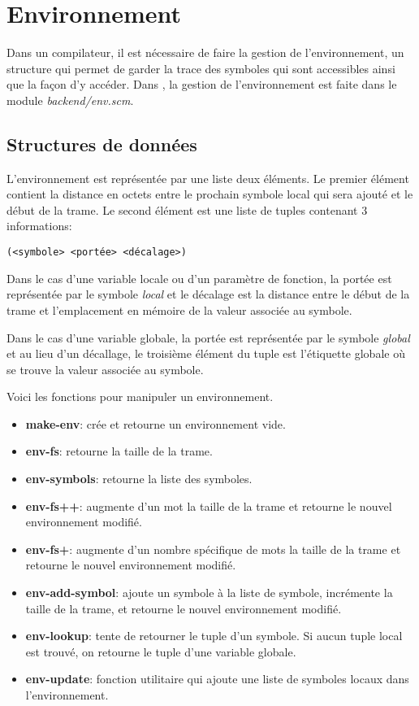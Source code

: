 \documentclass[10pt]{report}
\begin{document}
\chapter{Environnement}

Dans un compilateur, il est nécessaire de faire la gestion de
l'environnement, un structure qui permet de garder la trace des
symboles qui sont accessibles ainsi que la façon d'y accéder. Dans
\sins{}, la gestion de l'environnement est faite dans le module {\it
  backend/env.scm}.

\section{Structures de données}

L'environnement est représentée par une liste deux éléments. Le
premier élément contient la distance en octets entre le prochain
symbole local qui sera ajouté et le début de la trame. Le second
élément est une liste de tuples contenant 3 informations:


\begin{verbatim}
(<symbole> <portée> <décalage>)
\end{verbatim}

Dans le cas d'une variable locale ou d'un paramètre de fonction, la
portée est représentée par le symbole {\it local} et le décalage est la
distance entre le début de la trame et l'emplacement en mémoire de la
valeur associée au symbole.

Dans le cas d'une variable globale, la portée est représentée par le
symbole {\it global} et au lieu d'un décallage, le troisième élément
du tuple est l'étiquette globale où se trouve la valeur associée au
symbole.

Voici les fonctions pour manipuler un environnement.

\begin{itemize}
\item {\bf make-env}: crée et retourne un environnement vide.
\item {\bf env-fs}: retourne la taille de la trame.
\item {\bf env-symbols}: retourne la liste des symboles.
\item {\bf env-fs++}: augmente d'un mot la taille de la trame et
  retourne le nouvel environnement modifié.
\item {\bf env-fs+}: augmente d'un nombre spécifique de mots la taille
  de la trame et retourne le nouvel environnement modifié.
\item {\bf env-add-symbol}: ajoute un symbole à la liste de symbole,
  incrémente la taille de la trame, et retourne le nouvel
  environnement modifié.
\item {\bf env-lookup}: tente de retourner le tuple d'un symbole. Si
  aucun tuple local est trouvé, on retourne le tuple d'une variable
  globale.
\item {\bf env-update}: fonction utilitaire qui ajoute une liste de
  symboles locaux dans l'environnement.
\end{itemize}
\end{document}
